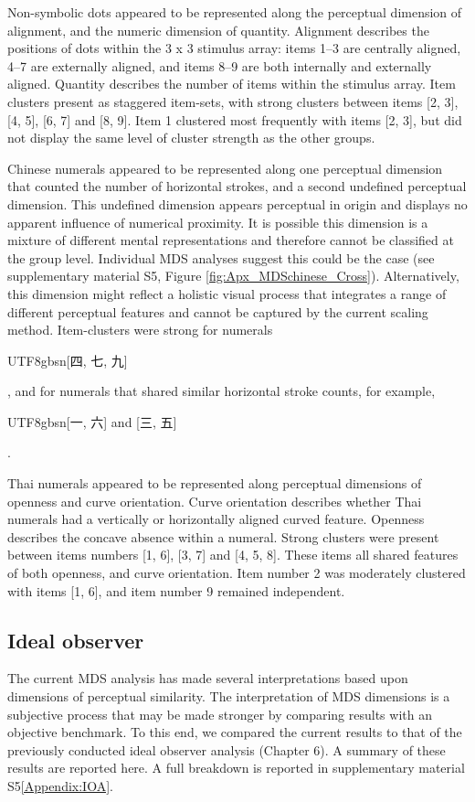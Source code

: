 Non-symbolic dots appeared to be represented along the perceptual dimension of alignment, and the numeric dimension of quantity. Alignment describes the positions of dots within the 3 x 3 stimulus array: items 1--3 are centrally aligned, 4--7 are externally aligned, and items 8--9 are both internally and externally aligned. Quantity describes the number of items within the stimulus array. Item clusters present as staggered item-sets, with strong clusters between items [2, 3], [4, 5], [6, 7] and [8, 9]. Item 1 clustered most frequently with items [2, 3], but did not display the same level of cluster strength as the other groups. 



Chinese numerals appeared to be represented along one perceptual dimension that counted the number of horizontal strokes, and a second undefined perceptual dimension. This undefined dimension appears perceptual in origin and displays no apparent influence of numerical proximity. It is possible this dimension is a mixture of different mental representations and therefore cannot be classified at the group level. Individual MDS analyses suggest this could be the case (see supplementary material S5, Figure \ref{fig:Apx_MDSchinese_Cross}). Alternatively, this dimension might reflect a holistic visual process that integrates a range of different perceptual features and cannot be captured by the current scaling method. Item-clusters were strong for numerals \begin{CJK}{UTF8}{gbsn}[四, 七, 九]\end{CJK}, and for numerals that shared similar horizontal stroke counts, for example, \begin{CJK}{UTF8}{gbsn}[一, 六] and [三, 五]\end{CJK}.

Thai numerals appeared to be represented along perceptual dimensions of openness and curve orientation. Curve orientation describes whether Thai numerals had a vertically or horizontally aligned curved feature. Openness describes the concave absence within a numeral. Strong clusters were present between items numbers [1, 6], [3, 7] and [4, 5, 8]. These items all shared features of both openness, and curve orientation. Item number 2 was moderately clustered with items [1, 6], and item number 9 remained independent. 

\subsection{Ideal observer}
The current MDS analysis has made several interpretations based upon dimensions of perceptual similarity. The interpretation of MDS dimensions is a subjective process that may be made stronger by comparing results with an objective benchmark. To this end, we compared the current results to that of the previously conducted ideal observer analysis (Chapter 6). A summary of these results are reported here. A full breakdown is reported in supplementary material S5\ref{Appendix:IOA}. 


